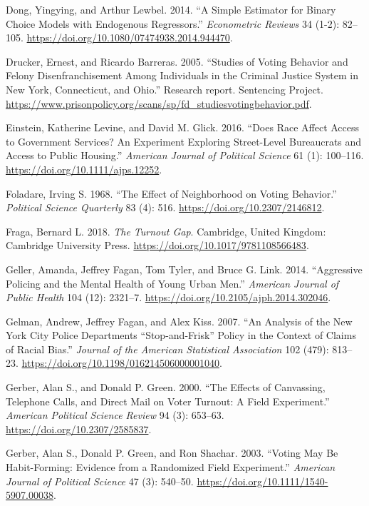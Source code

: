 \documentclass[12pt,]{article}
\begin{document}
\leavevmode\hypertarget{ref-Dong2014}{}%
Dong, Yingying, and Arthur Lewbel. 2014. ``A Simple Estimator for Binary Choice Models with Endogenous Regressors.'' \emph{Econometric Reviews} 34 (1-2): 82--105. \url{https://doi.org/10.1080/07474938.2014.944470}.

\leavevmode\hypertarget{ref-Drucker2005}{}%
Drucker, Ernest, and Ricardo Barreras. 2005. ``Studies of Voting Behavior and Felony Disenfranchisement Among Individuals in the Criminal Justice System in New York, Connecticut, and Ohio.'' Research report. Sentencing Project. \url{https://www.prisonpolicy.org/scans/sp/fd_studiesvotingbehavior.pdf}.

\leavevmode\hypertarget{ref-Einstein2016}{}%
Einstein, Katherine Levine, and David M. Glick. 2016. ``Does Race Affect Access to Government Services? An Experiment Exploring Street-Level Bureaucrats and Access to Public Housing.'' \emph{American Journal of Political Science} 61 (1): 100--116. \url{https://doi.org/10.1111/ajps.12252}.

\leavevmode\hypertarget{ref-Foladare1968}{}%
Foladare, Irving S. 1968. ``The Effect of Neighborhood on Voting Behavior.'' \emph{Political Science Quarterly} 83 (4): 516. \url{https://doi.org/10.2307/2146812}.

\leavevmode\hypertarget{ref-Fraga2018}{}%
Fraga, Bernard L. 2018. \emph{The Turnout Gap}. Cambridge, United Kingdom: Cambridge University Press. \url{https://doi.org/10.1017/9781108566483}.

\leavevmode\hypertarget{ref-Geller2014}{}%
Geller, Amanda, Jeffrey Fagan, Tom Tyler, and Bruce G. Link. 2014. ``Aggressive Policing and the Mental Health of Young Urban Men.'' \emph{American Journal of Public Health} 104 (12): 2321--7. \url{https://doi.org/10.2105/ajph.2014.302046}.

\leavevmode\hypertarget{ref-Gelman2007}{}%
Gelman, Andrew, Jeffrey Fagan, and Alex Kiss. 2007. ``An Analysis of the New York City Police Departments ``Stop-and-Frisk'' Policy in the Context of Claims of Racial Bias.'' \emph{Journal of the American Statistical Association} 102 (479): 813--23. \url{https://doi.org/10.1198/016214506000001040}.

\leavevmode\hypertarget{ref-Gerber2000}{}%
Gerber, Alan S., and Donald P. Green. 2000. ``The Effects of Canvassing, Telephone Calls, and Direct Mail on Voter Turnout: A Field Experiment.'' \emph{American Political Science Review} 94 (3): 653--63. \url{https://doi.org/10.2307/2585837}.

\leavevmode\hypertarget{ref-Gerber2003}{}%
Gerber, Alan S., Donald P. Green, and Ron Shachar. 2003. ``Voting May Be Habit-Forming: Evidence from a Randomized Field Experiment.'' \emph{American Journal of Political Science} 47 (3): 540--50. \url{https://doi.org/10.1111/1540-5907.00038}.
\end{document}

